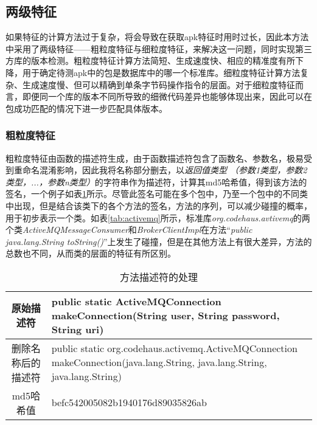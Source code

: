 \subsection{两级特征}
如果特征的计算方法过于复杂，将会导致在获取apk特征时用时过长，因此本方法中采用了两级特征——粗粒度特征与细粒度特征，来解决这一问题，同时实现第三方库的版本检测。粗粒度特征计算方法简短、生成速度快、相应的精准度有所下降，用于确定待测apk中的包是数据库中的哪一个标准库。细粒度特征计算方法复杂、生成速度慢、但可以精确到单条字节码操作指令的层面。对于细粒度特征而言，即便同一个库的版本不同所导致的细微代码差异也能够体现出来，因此可以在包成功匹配的情况下进一步匹配具体版本。


\subsubsection{粗粒度特征}

粗粒度特征由函数的描述符生成，由于函数描述符包含了函数名、参数名，极易受到重命名混淆影响，因此我将名称部分删去，以\textit{返回值类型 （参数1类型，参数2类型，...，参数n类型）}的字符串作为描述符，计算其md5哈希值，得到该方法的签名，一个例子如表\ref{tab:descriptor}所示。尽管此签名可能在多个包中，乃至一个包中的不同类中出现，但是结合该类下的各个方法的签名，方法的序列，可以减少碰撞的概率，用于初步表示一个类。如表\ref{tab:activemq}所示，标准库\textit{org.codehaus.avtivemq}的两个类\textit{ActiveMQMessageConsumer}和\textit{BrokerClientImpl}在方法“\textit{public java.lang.String toString()}”上发生了碰撞，但是在其他方法上有很大差异，方法的总数也不同，从而类的层面的特征有所区别。


\begin{table}[!hpt]
  \caption{方法描述符的处理}
  \label{tab:descriptor}
  \centering
  \begin{tabular}{cp{8cm}} \toprule
    原始描述符 & public static ActiveMQConnection makeConnection(String user, String password, String uri)\\ \midrule
    删除名称后的描述符  & public static org.codehaus.activemq.ActiveMQConnection makeConnection(java.lang.String, java.lang.String, java.lang.String) \\ \midrule
    md5哈希值      & befc542005082b1940176d89035826ab \\ \bottomrule
  \end{tabular}
\end{table}

